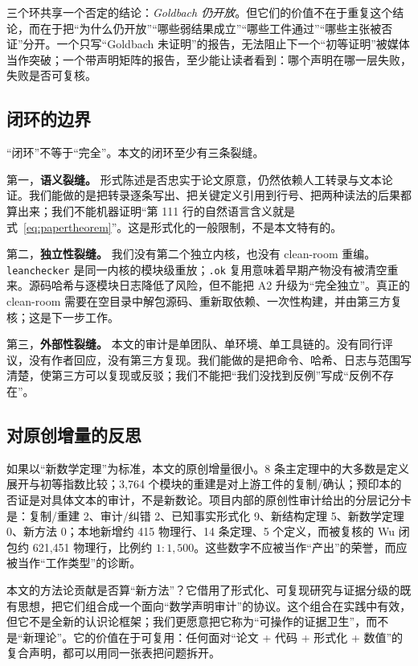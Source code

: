 \documentclass[11pt,a4paper]{ctexart}
\theoremstyle{plain}
\theoremstyle{definition}
\begin{document}
三个环共享一个否定的结论：\emph{Goldbach 仍开放}。但它们的价值不在于重复这个结论，而在于把“为什么仍开放”“哪些弱结果成立”“哪些工件通过”“哪些主张被否证”分开。一个只写“Goldbach 未证明”的报告，无法阻止下一个“初等证明”被媒体当作突破；一个带声明矩阵的报告，至少能让读者看到：哪个声明在哪一层失败，失败是否可复核。

\subsection{闭环的边界}
\label{sec:limits-closed}

“闭环”不等于“完全”。本文的闭环至少有三条裂缝。

第一，\textbf{语义裂缝。} 形式陈述是否忠实于论文原意，仍然依赖人工转录与文本论证。我们能做的是把转录逐条写出、把关键定义引用到行号、把两种读法的后果都算出来；我们不能机器证明“第 111 行的自然语言含义就是式~\eqref{eq:papertheorem}”。这是形式化的一般限制，不是本文特有的。

第二，\textbf{独立性裂缝。} 我们没有第二个独立内核，也没有 clean-room 重编。\texttt{leanchecker} 是同一内核的模块级重放；\texttt{.ok} 复用意味着早期产物没有被清空重来。源码哈希与逐模块日志降低了风险，但不能把 A2 升级为“完全独立”。真正的 clean-room 需要在空目录中解包源码、重新取依赖、一次性构建，并由第三方复核；这是下一步工作。

第三，\textbf{外部性裂缝。} 本文的审计是单团队、单环境、单工具链的。没有同行评议，没有作者回应，没有第三方复现。我们能做的是把命令、哈希、日志与范围写清楚，使第三方可以复现或反驳；我们不能把“我们没找到反例”写成“反例不存在”。

\subsection{对原创增量的反思}
\label{sec:reflexive}

如果以“新数学定理”为标准，本文的原创增量很小。8 条主定理中的大多数是定义展开与初等指数比较；3,764 个模块的重建是对上游工件的复制/确认；预印本的否证是对具体文本的审计，不是新数论。项目内部的原创性审计给出的分层记分卡是：复制/重建 2、审计/纠错 2、已知事实形式化 9、新结构定理 5、新数学定理 0、新方法 0；本地新增约 415 物理行、14 条定理、5 个定义，而被复核的 Wu 闭包约 621,451 物理行，比例约 $1:1{,}500$。这些数字不应被当作“产出”的荣誉，而应被当作“工作类型”的诊断。

本文的方法论贡献是否算“新方法”？它借用了形式化、可复现研究与证据分级的既有思想，把它们组合成一个面向“数学声明审计”的协议。这个组合在实践中有效，但它不是全新的认识论框架；我们更愿意把它称为“可操作的证据卫生”，而不是“新理论”。它的价值在于可复用：任何面对“论文 + 代码 + 形式化 + 数值”的复合声明，都可以用同一张表把问题拆开。
\end{document}
